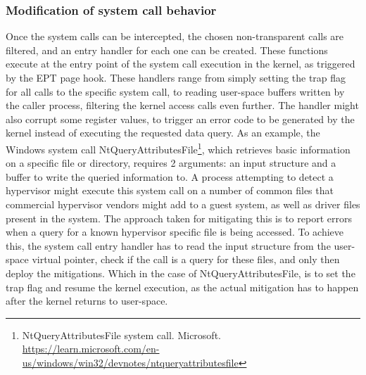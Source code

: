 \subsubsection{Modification of system call behavior}
Once the system calls can be intercepted, the chosen non-transparent calls are filtered, and an entry handler for each one can be created. 
These functions execute at the entry point of the system call execution in the kernel, as triggered by the EPT page hook. 
These handlers range from simply setting the trap flag for all calls to the specific system call, to reading user-space buffers written by the caller process, 
filtering the kernel access calls even further. The handler might also corrupt some register values, to trigger an error code to be generated by the kernel 
instead of executing the requested data query. As an example, the Windows system call NtQueryAttributesFile\footnote{NtQueryAttributesFile system call. Microsoft. \url{https://learn.microsoft.com/en-us/windows/win32/devnotes/ntqueryattributesfile}}, 
which retrieves basic information on a specific file or directory, requires 2 arguments: an input structure and a buffer to write the queried information to.
A process attempting to detect a hypervisor might execute this system call on a number of common files that commercial hypervisor vendors might add to a guest system, 
as well as driver files present in the system. The approach taken for mitigating this is to report errors when a query for a known hypervisor specific file is being accessed. 
To achieve this, the system call entry handler has to read the input structure from the user-space virtual pointer, check if the call is a query for these  files, 
and only then deploy the mitigations. Which in the case of NtQueryAttributesFile, is to set the trap flag and resume the kernel execution, 
as the actual mitigation has to happen after the kernel returns to user-space.

